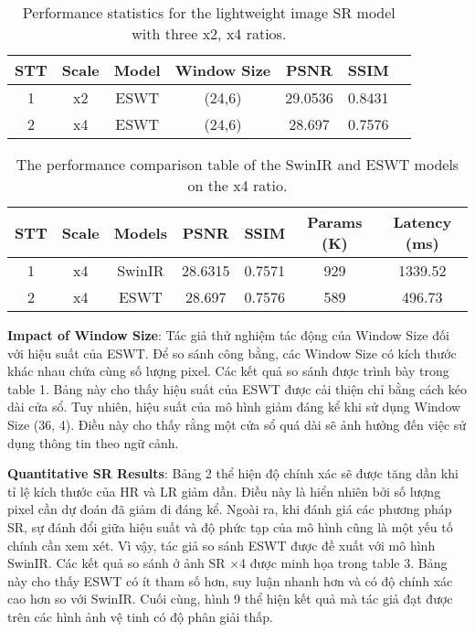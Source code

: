 \documentclass[conference]{IEEEtran}
\begin{document}
\begin{table}[!t]
    \centering
    \begin{tabular}{|c|c|c|c|c|c|c|}
    \hline
    STT & Scale & Model & Window Size & PSNR & SSIM \\ \hline
    1   & x2   & ESWT & (24,6) & 29.0536  & 0.8431   \\ \hline
    2   & x4   & ESWT & (24,6) & 28.697 &  0.7576 \\ \hline
    \end{tabular}
    \caption{Performance statistics for the lightweight image SR model with three x2, x4 ratios.}
\end{table}

\begin{table}[!t]
    \centering
    \begin{tabular}{|c|c|c|c|c|c|c|}
    \hline
    STT & Scale & Models & PSNR & SSIM & Params (K) & Latency (ms) \\ \hline
    1   & x4   & SwinIR & 28.6315  & 0.7571 & 929 & 1339.52   \\ \hline
    2   & x4   & ESWT & 28.697  & 0.7576 & 589 & 496.73 \\ \hline
    \end{tabular}
    \caption{The performance comparison table of the SwinIR and ESWT models on the x4 ratio.}
\end{table}

\textbf{Impact of Window Size}: Tác giả thử nghiệm tác động của Window Size đối với hiệu suất của ESWT. Để so sánh công bằng, các Window Size có kích thước khác nhau chứa cùng số lượng pixel. Các kết quả so sánh được trình bày trong table 1. Bảng này cho thấy hiệu suất của ESWT được cải thiện chỉ bằng cách kéo dài cửa sổ. Tuy nhiên, hiệu suất của mô hình giảm đáng kể khi sử dụng Window Size (36, 4). Điều này cho thấy rằng một cửa sổ quá dài sẽ ảnh hưởng đến việc sử dụng thông tin theo ngữ cảnh.

\textbf{Quantitative SR Results}: Bảng 2 thể hiện độ chính xác sẽ được tăng dần khi tỉ lệ kích thước của HR và LR giảm dần. Điều này là hiển nhiên bởi số lượng pixel cần dự đoán đã giảm đi đáng kể. Ngoài ra, khi đánh giá các phương pháp SR, sự đánh đổi giữa hiệu suất và độ phức tạp của mô hình cũng là một yếu tố chính cần xem xét. Vì vậy, tác giả so sánh ESWT được đề xuất với mô hình SwinIR. Các kết quả so sánh ở ảnh SR ×4 được minh họa trong table 3. Bảng này cho thấy ESWT có ít tham số hơn, suy luận nhanh hơn và có độ chính xác cao hơn so với SwinIR. Cuối cùng, hình 9 thể hiện kết quả mà tác giả đạt được trên các hình ảnh vệ tinh có độ phân giải thấp.
\end{document}
